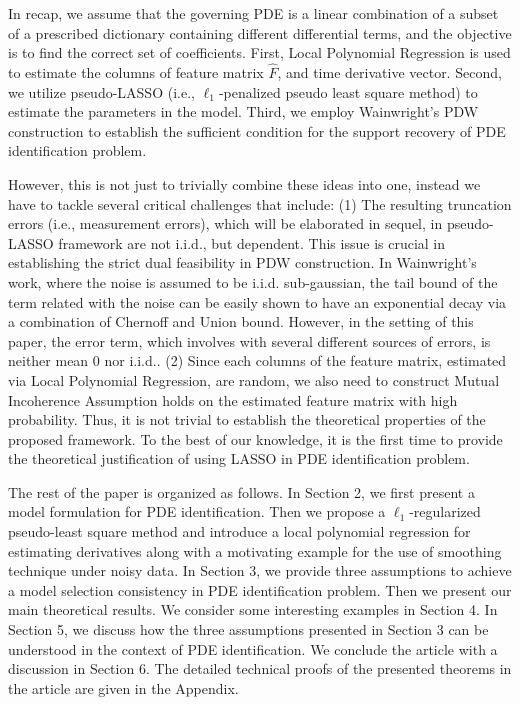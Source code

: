 \documentclass[a4paper,11pt]{article}
\begin{document}
In recap, we assume that the governing PDE is a linear combination of a subset of a prescribed dictionary containing different differential terms, and the objective is to find the correct set of coefficients. First, Local Polynomial Regression is used to estimate the columns of feature matrix $\widehat{F}$, and time derivative vector. Second, we utilize pseudo-LASSO (i.e., $\ell_{1}$-penalized pseudo least square method) to estimate the parameters in the model. Third, we employ Wainwright’s PDW construction to establish the sufficient condition for the support recovery of PDE identification problem.

However, this is not just to trivially combine these ideas into one, instead we have to tackle several critical challenges that include: (1) The resulting truncation errors (i.e., measurement errors), which will be elaborated in sequel, in pseudo-LASSO framework are not i.i.d., but dependent. This issue is crucial in establishing the strict dual feasibility in PDW construction. In Wainwright’s work, where the noise is assumed to be i.i.d. sub-gaussian, the tail bound of the term related with the noise can be easily shown to have an exponential decay via a combination of Chernoff and Union bound. However, in the setting of this paper, the error term, which involves with several different sources of errors, is neither mean 0 nor i.i.d.. (2) Since each columns of the feature matrix, estimated via Local Polynomial Regression, are random, we also need to construct Mutual Incoherence Assumption holds on the estimated feature matrix with high probability.
Thus, it is not trivial to establish the theoretical properties of the proposed framework. To the best of our knowledge,
it is
the first time to provide the theoretical justification of using LASSO in PDE identification problem.

The rest of the paper is organized as follows. In Section 2, we first present a model formulation for PDE identification. Then we propose a $\ell_{1}$-regularized pseudo-least square method and introduce a local polynomial regression for estimating derivatives along with a motivating example for the use of smoothing technique under noisy data. In Section 3, we provide three assumptions to achieve a model selection consistency in PDE identification problem. Then we present our main theoretical results. We consider some interesting examples in Section 4. In Section 5, we discuss how the three assumptions presented in Section 3 can be understood in the context of PDE identification. We conclude the article with a discussion in Section 6. The detailed technical proofs of the presented theorems in the article are given in the Appendix.
\end{document}
